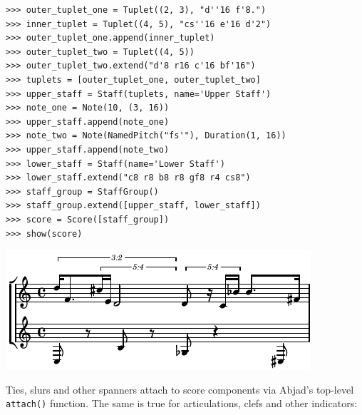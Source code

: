 \documentclass{article}
\begin{document}
\begin{lstlisting}
>>> outer_tuplet_one = Tuplet((2, 3), "d''16 f'8.")
>>> inner_tuplet = Tuplet((4, 5), "cs''16 e'16 d'2")
>>> outer_tuplet_one.append(inner_tuplet)
>>> outer_tuplet_two = Tuplet((4, 5))
>>> outer_tuplet_two.extend("d'8 r16 c'16 bf'16")
>>> tuplets = [outer_tuplet_one, outer_tuplet_two]
>>> upper_staff = Staff(tuplets, name='Upper Staff')
>>> note_one = Note(10, (3, 16))
>>> upper_staff.append(note_one)
>>> note_two = Note(NamedPitch("fs'"), Duration(1, 16))
>>> upper_staff.append(note_two)
>>> lower_staff = Staff(name='Lower Staff')
>>> lower_staff.extend("c8 r8 b8 r8 gf8 r4 cs8")
>>> staff_group = StaffGroup()
>>> staff_group.extend([upper_staff, lower_staff])
>>> score = Score([staff_group])
>>> show(score)
\end{lstlisting}
\includegraphics{assets/lilypond-45865c9ff19c72c1c9f7a6f4234e8546.pdf}

\noindent Ties, slurs and other spanners attach to score components via Abjad's
top-level \texttt{attach()} function. The same is true for articulations, clefs
and other indicators:

\end{document}
